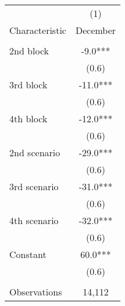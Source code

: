 \begin{tabular}{lc} \hline
 & (1) \\
Characteristic & December \\ \hline
 &  \\
2nd block & -9.0*** \\
 & (0.6) \\
3rd block & -11.0*** \\
 & (0.6) \\
4th block & -12.0*** \\
 & (0.6) \\
2nd scenario & -29.0*** \\
 & (0.6) \\
3rd scenario & -31.0*** \\
 & (0.6) \\
4th scenario & -32.0*** \\
 & (0.6) \\
Constant & 60.0*** \\
 & (0.6) \\
 &  \\
 Observations & 14,112 \\ \hline
\end{tabular}
